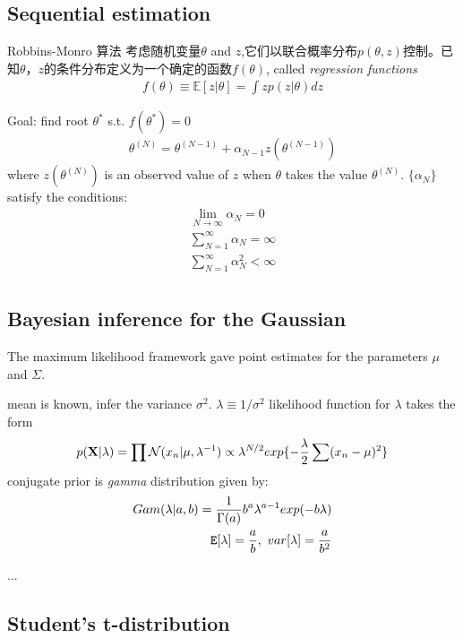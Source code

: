 \documentclass[a4paper]{article}
\begin{document}
\subsection{Sequential estimation}
Robbins-Monro 算法
考虑随机变量$\theta$ and $z$,它们以联合概率分布$p(\theta,z)$控制。已知$\theta$，$z$的条件分布定义为一个确定的函数$f(\theta)$, called \textit{regression functions}
\begin{align}
  f(\theta) \equiv \mathbb{E}[z|\theta] = \int zp(z|\theta)dz
\end{align}

Goal: find root $\theta^*$ s.t. $f(\theta^*) = 0$
\begin{align}
  \theta^{(N)} = \theta^{(N-1)} + \alpha_{N-1} z(\theta^{(N-1)})
\end{align}
where $z(\theta^{(N)})$ is an observed value of $z$ when $\theta$ takes the value $\theta^{(N)}$. $\{\alpha_N\}$ satisfy the conditions:
\begin{align*}
\lim_{N \to \infty} \alpha_N = 0\\
\sum_{N=1}^\infty \alpha_N = \infty\\
\sum_{N=1}^\infty \alpha_N^2 < \infty\\
\end{align*}

\subsection{Bayesian inference for the Gaussian}
\label{sec:2.3.6}
The maximum likelihood framework gave point estimates for the parameters $\mu$ and $\Sigma$.

mean is known, infer the variance $\sigma^2$. $ \lambda \equiv 1/\sigma^2 $ likelihood function for $\lambda$ takes the form
\begin{align}
  p(\mathbf{X}|\lambda) = \prod \mathcal{N}(x_n|\mu,\lambda^{-1}) \propto \lambda^{N/2} exp \{ -{\lambda \over 2} \sum (x_n-\mu)^2 \}
\end{align}
conjugate prior is \textit{gamma} distribution given by:
\begin{align}
  Gam(\lambda|a,b) = {1 \over \Gamma(a)} b^a\lambda^{a-1}exp(-b\lambda)\\
  \mathtt{E}[\lambda] = {a \over b},\,\,var[\lambda] = {a \over b^2}
\end{align}

...

\subsection{Student’s t-distribution}
\end{document}
